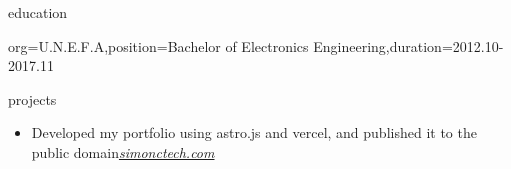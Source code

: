 \documentclass{resume}
\begin{document}
\begin{ResumeSection}{education}
    \begin{ResumeSubsection}{org={U.N.E.F.A},position={Bachelor of Electronics Engineering},duration={2012.10-2017.11}}
    \end{ResumeSubsection}
\end{ResumeSection}

\begin{ResumeSection}{projects}
        \begin{itemize}
        \item Developed my portfolio using astro.js and vercel, and published it to the public domain\hfill\em{{\href{https://www.simonctech.com}{simonctech.com}}}
    \end{itemize}
\end{ResumeSection}
\end{document}
